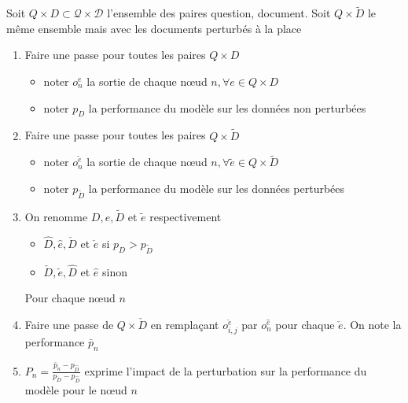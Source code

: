             \begin{tcolorbox}[
                colback=gray!5!white,
                colframe=gray!75!black,
                title=Activation Patching pour l'Extraction d'Information \cite{chen_axiomatic_2024}]

                Soit $Q \times D \subset \mathcal{Q}\times\mathcal{D}$  l'ensemble des paires question, document. Soit $Q \times \tilde{D}$ le même ensemble mais avec les documents perturbés à la place 

                \begin{enumerate}
                    \item Faire une passe pour toutes les paires $Q\times D$
                    \begin{itemize}
                        \item noter $o_{n}^e$ la sortie de chaque nœud $n, \forall e \in Q\times D$
                        \item noter $p_D$ la performance du modèle sur les données non perturbées
                    \end{itemize} 
                    \item Faire une passe pour toutes les paires $Q\times \tilde{D}$
                    \begin{itemize}
                        \item noter $o_{n}^{\tilde{e}}$ la sortie de chaque nœud $n, \forall \tilde{e} \in Q\times \tilde{D}$
                        \item noter $p_{\tilde{D}}$ la performance du modèle sur les données perturbées
                    \end{itemize}
                    \item On renomme $D, e, \tilde{D}$ et $\tilde{e}$ respectivement
                    \begin{itemize}
                        \item $\hat{D}, \hat{e}, \check{D}$ et $\check{e}$ si $p_D > p_{\tilde{D}}$
                        \item $\check{D}, \check{e}, \hat{D}$ et $\hat{e}$ sinon
                    \end{itemize}
                    Pour chaque nœud $n$
                    \item Faire une passe de $Q\times\check{D}$ en remplaçant $o_{i,j}^{\check{e}}$ par $o_{n}^{\hat{e}}$ pour chaque $\check{e}$. On note la performance $\bar{p}_n$
                    \item $P_{n} = \frac{\bar{p}_n - p_{\hat{D}} }{p_{\check{D}} - p_{\hat{D}}}$ exprime l'impact de la perturbation sur la performance du modèle pour le nœud $n$
                \end{enumerate}

                \label{box:activationPatchingIR}
            \end{tcolorbox}

